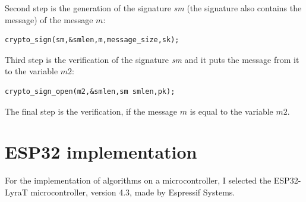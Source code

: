 \documentclass[thesis=M,english]{FITthesis}[2019/12/23]
\begin{document}
\bigskip
\noindent
Second step is the generation of the signature \textit{sm} (the signature also contains the message) of the message $m$:
\begin{lstlisting}[frame=single]
crypto_sign(sm,&smlen,m,message_size,sk);
\end{lstlisting}

\bigskip
\noindent
Third step is the verification of the signature \textit{sm} and it puts the message from it to the variable $m2$:
\begin{lstlisting}[frame=single]
crypto_sign_open(m2,&smlen,sm smlen,pk);
\end{lstlisting}

\noindent
The final step is the verification, if the message $m$ is equal to the variable $m2$.

\newpage
\section{ESP32 implementation} \label{ESP32_impl}
For the implementation of algorithms on a microcontroller, I selected the ESP32-LyraT microcontroller, version 4.3, made by Espressif Systems.
\end{document}
